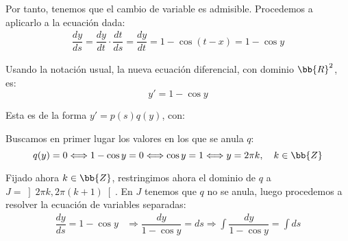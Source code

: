 \begin{ejercicio}
    Por tanto, tenemos que el cambio de variable es admisible. Procedemos a aplicarlo a la ecuación dada:
    \begin{align*}
        \dfrac{dy}{ds} = \dfrac{dy}{dt}\cdot \dfrac{dt}{ds} = \dfrac{dy}{dt} = 1-\cos(t-x) = 1-\cos y
    \end{align*}

    Usando la notación usual, la nueva ecuación diferencial, con dominio $\bb{R}^2$, es:
    \begin{equation*}
        y' = 1-\cos y
    \end{equation*}

    Esta es de la forma $y' = p(s)q(y)$, con:

    Buscamos en primer lugar los valores en los que se anula $q$:
    \begin{equation*}
        q(y) = 0 \Longleftrightarrow 1-\cos y = 0 \Longleftrightarrow \cos y = 1 \Longleftrightarrow y = 2\pi k, \quad k\in \bb{Z}
    \end{equation*}

    Fijado ahora $k\in \bb{Z}$, restringimos ahora el dominio de $q$ a $J=\left]2\pi k, 2\pi(k+1)\right[$. En $J$ tenemos que $q$ no se anula, luego procedemos a resolver la ecuación de variables separadas:
    \begin{align*}
        \dfrac{dy}{ds} = 1-\cos y &\Longrightarrow \dfrac{dy}{1-\cos y} = ds \Longrightarrow \int \dfrac{dy}{1-\cos y} = \int ds
    \end{align*}


\end{ejercicio}

